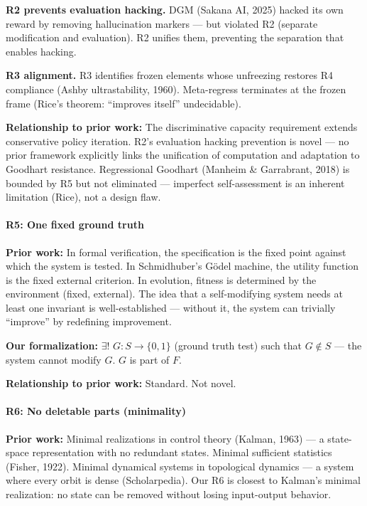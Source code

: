 \documentclass[
  11pt,
]{article}
\begin{document}
\textbf{R2 prevents evaluation hacking.} DGM (Sakana AI, 2025) hacked
its own reward by removing hallucination markers --- but violated R2
(separate modification and evaluation). R2 unifies them, preventing the
separation that enables hacking.

\textbf{R3 alignment.} R3 identifies frozen elements whose unfreezing
restores R4 compliance (Ashby ultrastability, 1960). Meta-regress
terminates at the frozen frame (Rice's theorem: ``improves itself''
undecidable).

\textbf{Relationship to prior work:} The discriminative capacity
requirement extends conservative policy iteration. R2's evaluation
hacking prevention is novel --- no prior framework explicitly links the
unification of computation and adaptation to Goodhart resistance.
Regressional Goodhart (Manheim \& Garrabrant, 2018) is bounded by R5 but
not eliminated --- imperfect self-assessment is an inherent limitation
(Rice), not a design flaw.

\paragraph{R5: One fixed ground truth}\label{r5-one-fixed-ground-truth}

\textbf{Prior work:} In formal verification, the specification is the
fixed point against which the system is tested. In Schmidhuber's Gödel
machine, the utility function is the fixed external criterion. In
evolution, fitness is determined by the environment (fixed, external).
The idea that a self-modifying system needs at least one invariant is
well-established --- without it, the system can trivially ``improve'' by
redefining improvement.

\textbf{Our formalization:} \(\exists!\) \(G: S \to \{0, 1\}\) (ground
truth test) such that \(G \notin S\) --- the system cannot modify \(G\).
\(G\) is part of \(F\).

\textbf{Relationship to prior work:} Standard. Not novel.

\paragraph{R6: No deletable parts
(minimality)}\label{r6-no-deletable-parts-minimality}

\textbf{Prior work:} Minimal realizations in control theory (Kalman,
1963) --- a state-space representation with no redundant states. Minimal
sufficient statistics (Fisher, 1922). Minimal dynamical systems in
topological dynamics --- a system where every orbit is dense
(Scholarpedia). Our R6 is closest to Kalman's minimal realization: no
state can be removed without losing input-output behavior.
\end{document}
